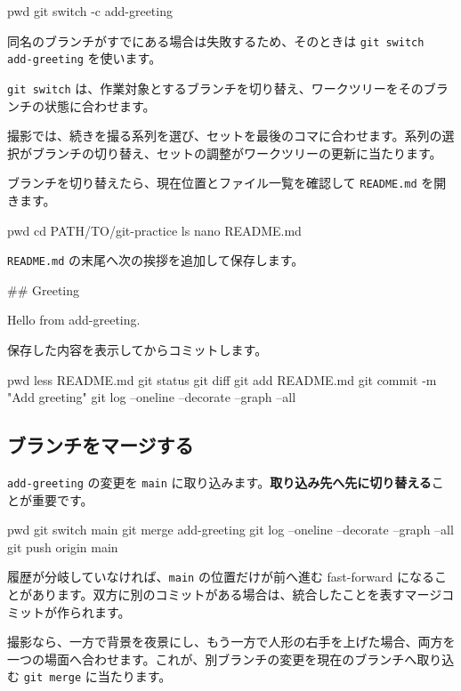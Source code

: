 \documentclass[a4paper,11pt]{jlreq}
\newcommand{\cmd}[1]{\texttt{#1}}
\newcommand{\term}[1]{\textbf{#1}}
\begin{document}
\begin{codeblock}
pwd
git switch -c add-greeting
\end{codeblock}

同名のブランチがすでにある場合は失敗するため、そのときは \cmd{git switch add-greeting} を使います。

\cmd{git switch} は、作業対象とするブランチを切り替え、ワークツリーをそのブランチの状態に合わせます。

撮影では、続きを撮る系列を選び、セットを最後のコマに合わせます。系列の選択がブランチの切り替え、セットの調整がワークツリーの更新に当たります。

ブランチを切り替えたら、現在位置とファイル一覧を確認して \cmd{README.md} を開きます。

\begin{codeblock}
pwd
cd PATH/TO/git-practice
ls
nano README.md
\end{codeblock}

\cmd{README.md} の末尾へ次の挨拶を追加して保存します。

\begin{codeblock}
## Greeting

Hello from add-greeting.
\end{codeblock}

保存した内容を表示してからコミットします。

\begin{codeblock}
pwd
less README.md
git status
git diff
git add README.md
git commit -m "Add greeting"
git log --oneline --decorate --graph --all
\end{codeblock}

\subsection{ブランチをマージする}

\cmd{add-greeting} の変更を \cmd{main} に取り込みます。\term{取り込み先へ先に切り替える}ことが重要です。

\begin{codeblock}
pwd
git switch main
git merge add-greeting
git log --oneline --decorate --graph --all
git push origin main
\end{codeblock}

履歴が分岐していなければ、\cmd{main} の位置だけが前へ進む fast-forward になることがあります。双方に別のコミットがある場合は、統合したことを表すマージコミットが作られます。

撮影なら、一方で背景を夜景にし、もう一方で人形の右手を上げた場合、両方を一つの場面へ合わせます。これが、別ブランチの変更を現在のブランチへ取り込む \cmd{git merge} に当たります。
\end{document}
